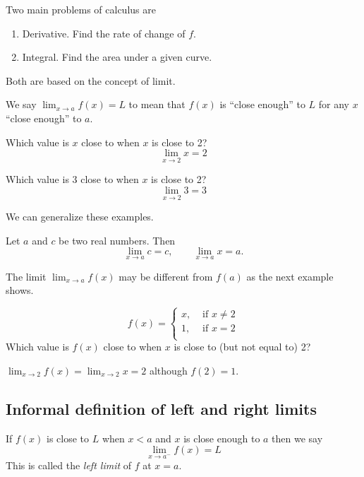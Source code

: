\documentclass[../calc1-main.tex]{subfiles}
\begin{document}
  Two main problems of calculus are
  \begin{enumerate}
    \item Derivative. Find the rate of change of $f$.
    \item Integral. Find the area under a given curve.
  \end{enumerate}
  Both are based on the concept of limit.

  We say $\lim_{x \to a} f(x) = L$ to mean that $f(x)$ is ``close enough'' to $L$ for any $x$ ``close enough'' to $a$.

  \begin{example}
    Which value is $x$ close to when $x$ is close to 2?
    \[
      \lim_{x \to 2} x = 2
    \]
  \end{example}

  \begin{example}
    Which value is 3 close to when $x$ is close to 2?
    \[
      \lim_{x \to 2} 3 = 3
    \]
  \end{example}

  We can generalize these examples.
  \begin{theorem}
    \label{basic limit theorems}
    Let $a$ and $c$ be two real numbers. Then
    \[
      \lim_{x \to a} c = c, \qquad
      \lim_{x \to a} x = a.
    \]
  \end{theorem}


  The limit $\lim_{x \to a} f(x)$ may be different from $f(a)$ as the next example shows.
  \begin{example}
    \[
      f(x) =
      \begin{cases}
        x, &\text{ if } x\neq 2\\
        1, &\text{ if } x = 2\\
      \end{cases}
    \]
    Which value is $f(x)$ close to when $x$ is close to (but not equal to) 2?

    $\lim_{x \to 2} f(x) = \lim_{x \to 2} x = 2$ although $f(2) = 1$.
  \end{example}

  \subsection*{Informal definition of left and right limits}
  If $f(x)$ is close to $L$ when $x<a$ and $x$ is close enough to $a$ then we say
  \[
    \lim_{x \to a^{-}} f(x) = L
  \]
  This is called the \emph{left limit} of $f$ at $x=a$.
\end{document}
